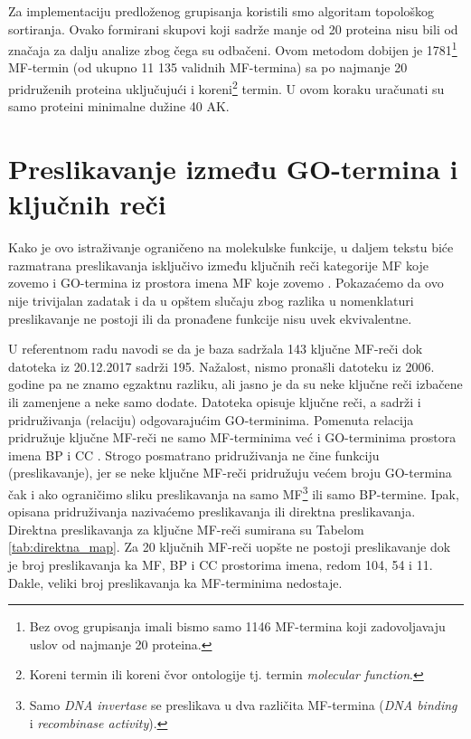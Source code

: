 Za implementaciju predloženog grupisanja koristili smo algoritam topološkog
sortiranja. Ovako formirani skupovi koji sadrže manje od 20 proteina nisu bili
od značaja za dalju analize zbog čega su odbačeni.
Ovom metodom dobijen je 1781\footnote{Bez ovog grupisanja imali bismo samo 1146
MF-termina  koji zadovoljavaju uslov od najmanje 20 proteina.} MF-termin (od ukupno
11 135 validnih MF-termina) sa po najmanje 20 pridruženih proteina uključujući i
koreni\footnote{Koreni termin ili koreni čvor ontologije tj.  termin
\textit{molecular function}.} termin. U ovom koraku uračunati su samo proteini
minimalne dužine 40 AK.

\section{Preslikavanje između GO-termina i ključnih reči}
\label{kw2go_mapiranje}

Kako je ovo istraživanje ograničeno na molekulske funkcije, u daljem tekstu
biće razmatrana preslikavanja isključivo između ključnih reči kategorije MF koje
zovemo  i GO-termina iz prostora imena MF koje zovemo
. Pokazaćemo da ovo nije trivijalan zadatak i da u opštem
slučaju zbog razlika u nomenklaturi preslikavanje ne postoji ili da pronađene
funkcije nisu uvek ekvivalentne.

U referentnom radu navodi se da je baza \swissprot sadržala 143 ključne MF-reči 
dok  datoteka  \cite{keywlist_txt} iz 20.12.2017 sadrži 195.
Nažalost, nismo pronašli   datoteku iz 2006. godine pa ne
znamo egzaktnu razliku, ali jasno je da su neke ključne reči
izbačene ili zamenjene a neke samo dodate. Datoteka  opisuje
ključne reči, a sadrži i pridruživanja (relaciju) odgovarajućim GO-terminima.
Pomenuta relacija pridružuje ključne MF-reči  ne samo MF-terminima već i
GO-terminima prostora imena BP i CC . Strogo posmatrano pridruživanja ne
čine funkciju (preslikavanje), jer se neke ključne MF-reči  pridružuju većem
broju GO-termina čak i ako ograničimo sliku preslikavanja na samo
MF\footnote{Samo \textit{DNA invertase} se preslikava u dva različita
MF-termina (\textit{DNA binding} i \textit{recombinase activity}).} ili samo
BP-termine.  Ipak, opisana pridruživanja nazivaćemo preslikavanja ili direktna
preslikavanja. Direktna preslikavanja za ključne MF-reči  sumirana su Tabelom
\ref{tab:direktna_map}.  Za 20 ključnih MF-reči  uopšte ne postoji preslikavanje
dok je broj preslikavanja ka MF, BP i CC prostorima imena, redom 104, 54 i
11. Dakle, veliki broj preslikavanja ka MF-terminima nedostaje.

